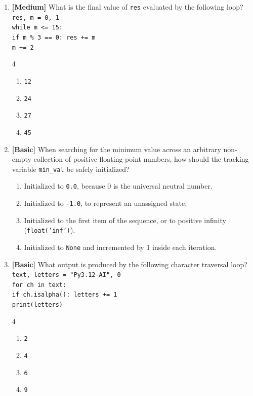 \documentclass[11pt,a4paper]{article}
\begin{document}
\begin{enumerate}[label=\textbf{Q\arabic*.},leftmargin=1.8em,itemsep=0.8pt,topsep=0.3pt,resume]

\item \textbf{[Medium]} What is the final value of \texttt{res} evaluated by the following loop?\\
\texttt{res, m = 0, 1}\\
\texttt{while m <= 15:}\\
\texttt{\phantom{XX}if m \% 3 == 0: res += m}\\
\texttt{\phantom{XX}m += 2}
\begin{multicols}{4}
\begin{enumerate}[label=\Alph*.]
  \item \texttt{12}
  \item \texttt{24}
  \item \texttt{27}
  \item \texttt{45}
\end{enumerate}
\end{multicols}

\item \textbf{[Basic]} When searching for the minimum value across an arbitrary non-empty collection of positive floating-point numbers, how should the tracking variable \texttt{min\_val} be safely initialized?
\begin{enumerate}[label=\Alph*.,leftmargin=1.8em]
  \item Initialized to \texttt{0.0}, because 0 is the universal neutral number.
  \item Initialized to \texttt{-1.0}, to represent an unassigned state.
  \item Initialized to the first item of the sequence, or to positive infinity (\texttt{float('inf')}).
  \item Initialized to \texttt{None} and incremented by 1 inside each iteration.
\end{enumerate}

\item \textbf{[Basic]} What output is produced by the following character traversal loop?\\
\texttt{text, letters = "Py3.12-AI", 0}\\
\texttt{for ch in text:}\\
\texttt{\phantom{XX}if ch.isalpha(): letters += 1}\\
\texttt{print(letters)}
\begin{multicols}{4}
\begin{enumerate}[label=\Alph*.]
  \item \texttt{2}
  \item \texttt{4}
  \item \texttt{6}
  \item \texttt{9}
\end{enumerate}
\end{multicols}


\end{enumerate}
\end{document}
